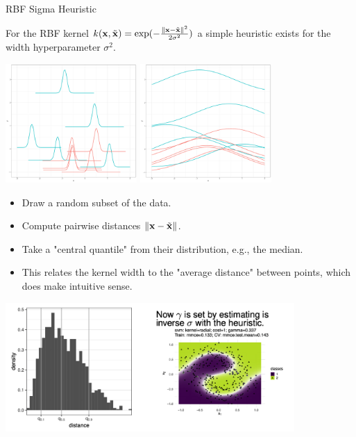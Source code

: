 \documentclass[11pt,compress,t,notes=noshow, xcolor=table]{beamer}
\begin{document}
\begin{vbframe}{RBF Sigma Heuristic}

For the RBF kernel $k(\mathbf{x}, \tilde {\mathbf{x}}) = \exp(-\frac{\|\mathbf{x} - \tilde {\mathbf{x}} \|^2}{2\sigma^2})$ a simple heuristic exists for the width hyperparameter $\sigma^2$. 

\lz


\begin{center}
  \includegraphics[width=5cm]{figure/svm_rbf_sigma_est_narrow.pdf}
  \includegraphics[width=5cm]{figure/svm_rbf_sigma_est_wide.pdf}
\end{center}  
\begin{footnotesize} 

\end{footnotesize}


\framebreak


\begin{itemize}
  \item Draw a random subset of the data.
  \item Compute pairwise distances $\|\mathbf{x} - \tilde {\mathbf{x}} \|$.
  \item Take a "central quantile" from their distribution, e.g., the median.
  \item This relates the kernel width to the "average distance" between points,
    which does make intuitive sense.
\end{itemize}

\begin{center}
\includegraphics[width = 11cm ]{figure_man/rbf_sigma.png}
\end{center}


\framebreak

\end{vbframe}
\end{document}
